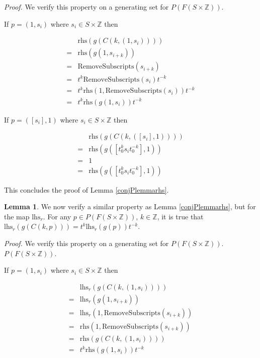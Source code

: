 \documentclass[12pt]{article} %
\theoremstyle{definition}
\theoremstyle{definition}
\theoremstyle{definition}
\newtheorem{lemma}{Lemma}[theorem]
\theoremstyle{definition}
\theoremstyle{definition}
\theoremstyle{definition}
\begin{document}
\textit{Proof.} We verify this property on a generating set for $P(F(S \times \mathbb{Z}))$.

If $p = (1, s_i)$ where $s_i \in S \times \mathbb{Z}$ then

\begin{equation}
  \begin{aligned}
    & \text{rhs}(g(C(k, (1, s_i)))) \\
    = &\text{rhs}(g(1, s_{i + k})) \\
    = & \text{RemoveSubscripts}(s_{i + k}) \\
    = & t^k \text{RemoveSubscripts}(s_i) t^{-k} \\
    = & t^k \text{rhs} (1, \text{RemoveSubscripts} (s_i)) t^{-k} \\
    = & t^k \text{rhs}(g(1, s_i)) t^{-k}
  \end{aligned}
\end{equation}

If $p = ([s_i], 1)$ where $s_i \in S \times \mathbb{Z}$ then

\begin{equation}
  \begin{aligned}
    & \text{rhs}(g(C(k, ([s_i], 1)))) \\
    = & \text{rhs}(g([t_0^k s_i t_0^{-k}], 1)) \\
    = & 1 \\
    = & \text{rhs}(g([t_0^k s_i t_0^{-k}], 1))
  \end{aligned}
\end{equation}

This concludes the proof of Lemma \ref{conjPlemmarhs}.

\begin{lemma}\label{conjPlemma}
  We now verify a similar property as Lemma \ref{conjPlemmarhs}, but for the map $\text{lhs}_r$.
  For any  $p \in P(F(S \times \mathbb{Z}))$, $k \in \mathbb{Z}$, it is true that
  $\text{lhs}_{r}(g(C(k, p))) = t^k \text{lhs}_{r}(g(p))t^{-k}$.
\end{lemma}

\textit{Proof.} We verify this property on a generating set for $P(F(S \times \mathbb{Z}))$.
$P(F(S \times \mathbb{Z}))$.

If $p = (1, s_i)$ where $s_i \in S \times \mathbb{Z}$ then

\begin{equation}
  \begin{aligned}
  & \text{lhs}_{r}(g(C(k, (1, s_i)))) \\
  = & \text{lhs}_r(g(1, s_{i + k})) \\
  = & \text{lhs}_r(1, \text{RemoveSubscripts}(s_{i + k})) \\
  = & \text{rhs}(1, \text{RemoveSubscripts}(s_{i + k})) \\
  = & \text{rhs}(g(C(k, (1, s_i)))) \\
  = & t^k \text{rhs}(g(1, s_i)) t^{-k}
  \end{aligned}
\end{equation}
\end{document}
